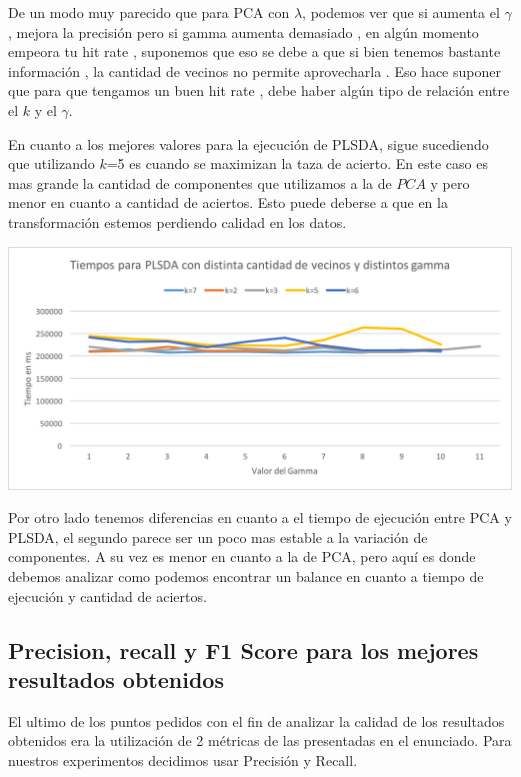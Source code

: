 De un modo muy parecido que para PCA con $\lambda$, podemos ver que si aumenta el $\gamma$, mejora la precisión pero si gamma aumenta demasiado , en algún momento empeora tu hit rate , suponemos que eso se debe a que si bien tenemos bastante información , la cantidad de vecinos no permite aprovecharla . Eso hace suponer que para que tengamos un buen hit rate , debe haber algún tipo de relación entre el $k$ y el $\gamma$.

En cuanto a los mejores valores para la ejecución de PLSDA, sigue sucediendo que utilizando $k$=5 es cuando se maximizan la taza de acierto. En este caso es mas grande la cantidad de componentes que utilizamos a la de $PCA$ y pero menor en cuanto a cantidad de aciertos. Esto puede deberse a que en la transformación estemos perdiendo calidad en los datos.

\begin{center}
\includegraphics[scale=0.8]{imagenes/TiemposPLSDA.png}
\end{center}

Por otro lado tenemos diferencias en cuanto a el tiempo de ejecución entre PCA y PLSDA, el segundo parece ser un poco mas estable a la variación de componentes. A su vez es menor en cuanto a la de PCA, pero aquí es donde debemos analizar como podemos encontrar un balance en cuanto a tiempo de ejecución y cantidad de aciertos.

\subsection {Precision, recall y F1 Score para los mejores resultados obtenidos}

El ultimo de los puntos pedidos con el fin de analizar la calidad de los resultados obtenidos era la utilización de 2 métricas de las presentadas en el enunciado. Para nuestros experimentos decidimos usar Precisión y Recall.

